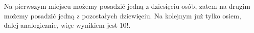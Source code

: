 \medskip
{} 
\medskip

Na pierwszym miejscu możemy posadzić jedną z dziesięciu osób, zatem na drugim
możemy posadzić jedną z pozostałych dziewięciu. Na kolejnym już tylko osiem,
dalej analogicznie, więc wynikiem jest $10!$.

